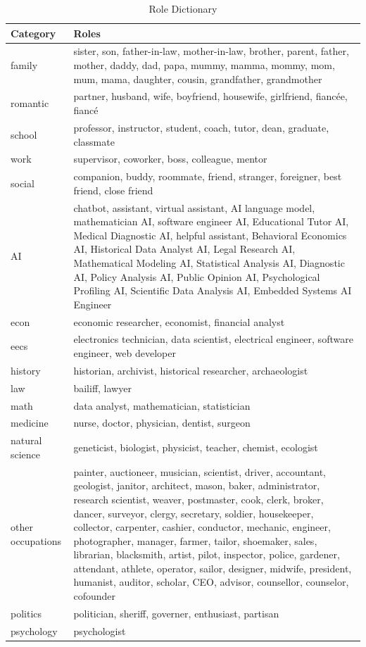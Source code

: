 \documentclass[11pt]{article}
\begin{document}
\begin{table}[ht]
    \centering
    \begin{tabularx}{\textwidth}{lX}
        \toprule
        Category & Roles \\
        \midrule
        family & sister, son, father-in-law, mother-in-law, brother, parent, father, mother, daddy, dad, papa, mummy, mamma, mommy, mom, mum, mama, daughter, cousin, grandfather, grandmother \\
        romantic & partner, husband, wife, boyfriend, housewife, girlfriend, fiancée, fiancé \\
        school & professor, instructor, student, coach, tutor, dean, graduate, classmate\\
        work & supervisor, coworker, boss, colleague, mentor \\
        social & companion, buddy, roommate, friend, stranger, foreigner, best friend, close friend \\
        AI & chatbot, assistant, virtual assistant, AI language model, mathematician AI, software engineer AI, Educational Tutor AI, Medical Diagnostic AI, helpful assistant, Behavioral Economics AI, Historical Data Analyst AI, Legal Research AI, Mathematical Modeling AI, Statistical Analysis AI, Diagnostic AI, Policy Analysis AI, Public Opinion AI, Psychological Profiling AI, Scientific Data Analysis AI, Embedded Systems AI Engineer\\
        econ & economic researcher, economist, financial analyst \\
        eecs & electronics technician, data scientist, electrical engineer, software engineer, web developer\\
        history & historian, archivist, historical researcher, archaeologist\\
        law & bailiff, lawyer\\
        math & data analyst, mathematician, statistician\\
        medicine & nurse, doctor, physician, dentist, surgeon\\
        natural science & geneticist, biologist, physicist, teacher, chemist, ecologist\\
        other occupations & painter, auctioneer, musician, scientist, driver, accountant, geologist, janitor, architect, mason, baker, administrator, research scientist, weaver, postmaster, cook, clerk, broker, dancer, surveyor, clergy, secretary, soldier, housekeeper, collector, carpenter, cashier, conductor, mechanic, engineer, photographer, manager, farmer, tailor, shoemaker, sales, librarian, blacksmith, artist, pilot, inspector, police, gardener, attendant, athlete, operator, sailor, designer, midwife, president, humanist, auditor, scholar, CEO, advisor, counsellor, counselor, cofounder\\
        politics & politician, sheriff, governer, enthusiast, partisan\\
        psychology & psychologist\\
        \bottomrule
    \end{tabularx}
    \caption{Role Dictionary}
    \label{tab:all_roles}
\end{table}
\end{document}

